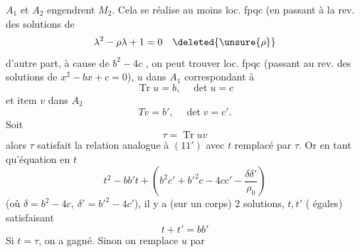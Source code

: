 $A_1$ et $A_2$  engendrent $M_2$. Cela se réalise au moins loc. fpqc (en passant à la  rev. des solutions de
\[ \lambda^2-\rho\lambda+1=0\quad\deleted{\unsure{\rho}} \]
d'autre part, à cause de $b^2-4c$ , on peut trouver loc. fpqc (passant au rev. des solutions de $x^2-bx+c=0$), $u$ dans $A_1$ correspondant à
\[ \operatorname{Tr}u=b,\quad \det u=c \]
et item $v$ dans $A_2$
\[ Tv=b',\quad \det v=c'. \]
Soit 
\[ \tau=\operatorname{Tr}uv \]
alors $\tau$ satisfait la relation analogue à $(11')$ avec $t$ remplacé par $\tau$. Or en tant qu'équation en $t$
\[ t^2-bb't+\left(b^2c'+b'^2c-4cc'-\frac{\delta\delta'}{\rho_0}\right) \]
(où $\delta=b^2-4c,\ \delta'=b'^2-4c'$), il y a  (sur un corps)  2 solutions,  $t,t'$ ( égales) satisfaisant
\[ t+t'=bb' \]
Si $t=\tau$, on a gagné. Sinon  on remplace $u$ par
